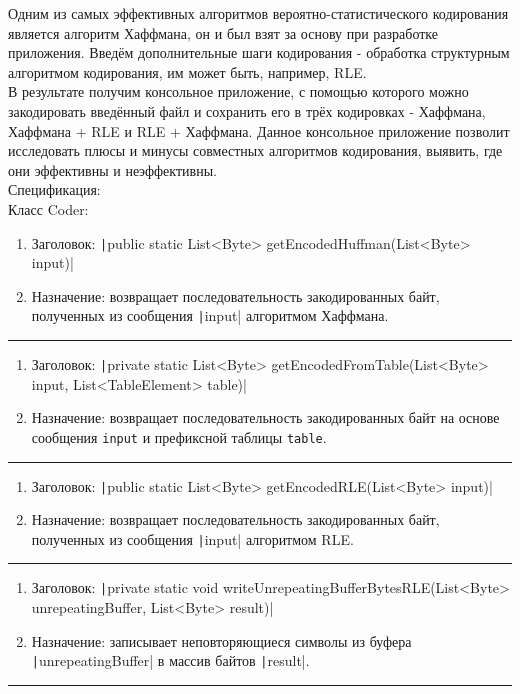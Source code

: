 \documentclass[a4paper,14pt]{extarticle}
\begin{document}
Одним из самых эффективных алгоритмов вероятно-статистического кодирования
является алгоритм Хаффмана, он и был взят за основу при разработке приложения.
Введём дополнительные шаги кодирования - обработка структурным алгоритмом кодирования,
им может быть, например, RLE.\\
В результате получим консольное приложение, с помощью которого можно закодировать
введённый файл и сохранить его в трёх кодировках - Хаффмана, Хаффмана + RLE и RLE + Хаффмана.
Данное консольное приложение позволит исследовать плюсы и минусы совместных алгоритмов кодирования,
выявить, где они эффективны и неэффективны.\\
Спецификация:\\
Класс Coder:
\begin{enumerate}
    \item Заголовок: \texttt|public static List<Byte> getEncodedHuffman(List<Byte> input)|
    \item Назначение: возвращает последовательность закодированных байт, полученных из сообщения \texttt|input| алгоритмом Хаффмана.
\end{enumerate}
\par\noindent\rule{\textwidth}{0.4pt}

\begin{enumerate}
    \item Заголовок: \texttt|private static List<Byte> getEncodedFromTable(List<Byte> input, List<TableElement> table)|
    \item Назначение: возвращает последовательность закодированных байт на основе сообщения \texttt{input} и префиксной таблицы \texttt{table}.
\end{enumerate}
\par\noindent\rule{\textwidth}{0.4pt}

\begin{enumerate}
    \item Заголовок: \texttt|public static List<Byte> getEncodedRLE(List<Byte> input)|
    \item Назначение: возвращает последовательность закодированных байт, полученных из сообщения \texttt|input| алгоритмом RLE.
\end{enumerate}
\par\noindent\rule{\textwidth}{0.4pt}

\begin{enumerate}
    \item Заголовок: \texttt|private static void writeUnrepeatingBufferBytesRLE(List<Byte> unrepeatingBuffer, List<Byte> result)|
    \item Назначение: записывает неповторяющиеся символы из буфера \texttt|unrepeatingBuffer| в массив байтов \texttt|result|.
\end{enumerate}
\par\noindent\rule{\textwidth}{0.4pt}
\end{document}

